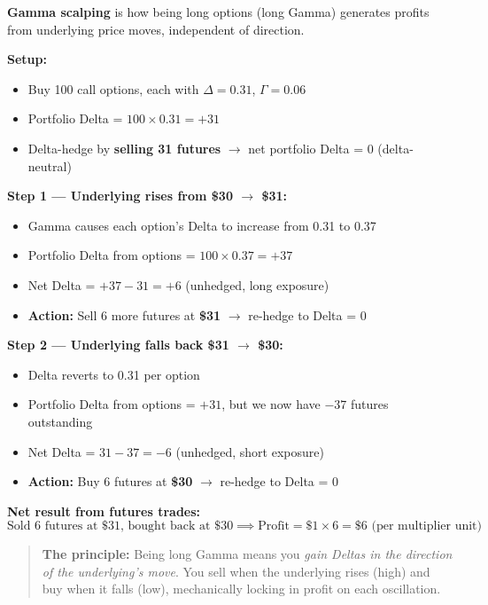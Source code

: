 \documentclass[12pt,openany]{book}
\begin{document}
\textbf{Gamma scalping} is how being long options (long Gamma) generates profits from underlying price moves, independent of direction.

\textbf{Setup:}
\begin{itemize}[leftmargin=*]
    \item Buy 100 call options, each with \(\Delta = 0.31\), \(\Gamma = 0.06\)
    \item Portfolio Delta = \(100 \times 0.31 = +31\)
    \item Delta-hedge by \textbf{selling 31 futures} \(\rightarrow\) net portfolio Delta = 0 (delta-neutral)
\end{itemize}

\textbf{Step 1 — Underlying rises from \$30 \(\rightarrow\) \$31:}
\begin{itemize}[leftmargin=*]
    \item Gamma causes each option's Delta to increase from 0.31 to 0.37
    \item Portfolio Delta from options = \(100 \times 0.37 = +37\)
    \item Net Delta = \(+37 - 31 = +6\) (unhedged, long exposure)
    \item \textbf{Action:} Sell 6 more futures at \textbf{\$31} \(\rightarrow\) re-hedge to Delta = 0
\end{itemize}

\textbf{Step 2 — Underlying falls back \$31 \(\rightarrow\) \$30:}
\begin{itemize}[leftmargin=*]
    \item Delta reverts to 0.31 per option
    \item Portfolio Delta from options = \(+31\), but we now have \(-37\) futures outstanding
    \item Net Delta = \(31 - 37 = -6\) (unhedged, short exposure)
    \item \textbf{Action:} Buy 6 futures at \textbf{\$30} \(\rightarrow\) re-hedge to Delta = 0
\end{itemize}

\textbf{Net result from futures trades:}
\[
\text{Sold 6 futures at \$31, bought back at \$30} \implies \text{Profit} = \$1 \times 6 = \$6 \text{ (per multiplier unit)}
\]

\begin{quote}
\textbf{The principle:} Being long Gamma means you \emph{gain Deltas in the direction of the underlying's move}. You sell when the underlying rises (high) and buy when it falls (low), mechanically locking in profit on each oscillation.
\end{quote}
\end{document}
